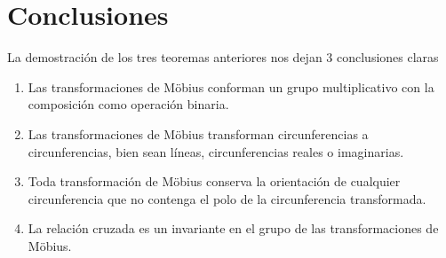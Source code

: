 \documentclass{matematicasud}
\begin{document}
\section{Conclusiones}
La demostración de los tres teoremas anteriores nos dejan 3 conclusiones claras
\begin{enumerate}
    \item Las transformaciones de Möbius conforman un grupo multiplicativo con la composición como operación binaria.
    \item Las transformaciones de Möbius transforman circunferencias a circunferencias, bien sean líneas, circunferencias reales o imaginarias.
    \item Toda transformación de Möbius conserva la orientación de cualquier circunferencia que no contenga el polo de la circunferencia transformada.
    \item La relación cruzada es un invariante en el grupo de las transformaciones de Möbius.
\end{enumerate}
\newpage




\end{document}
